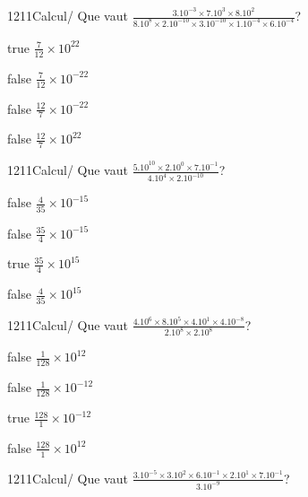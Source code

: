             \begin{question}{1211}{Calcul}{}{/}
                Que vaut $\frac{3.10^{-3}\times 7.10^{3}\times 8.10^{2}}{8.10^{8}\times 2.10^{-10}\times 3.10^{-10}\times 1.10^{-4}\times 6.10^{-4}}$?
            \end{question}
            \begin{reponses}
                \item[true] $\frac{7}{12}\times 10^{22}$
                \item[false] $\frac{7}{12}\times 10^{-22}$
                \item[false] $\frac{12}{7}\times 10^{-22}$
                \item[false] $\frac{12}{7}\times 10^{22}$
            \end{reponses}
            \begin{question}{1211}{Calcul}{}{/}
                Que vaut $\frac{5.10^{10}\times 2.10^{0}\times 7.10^{-1}}{4.10^{4}\times 2.10^{-10}}$?
            \end{question}
            \begin{reponses}
                \item[false] $\frac{4}{35}\times 10^{-15}$
                \item[false] $\frac{35}{4}\times 10^{-15}$
                \item[true] $\frac{35}{4}\times 10^{15}$
                \item[false] $\frac{4}{35}\times 10^{15}$
            \end{reponses}
            \begin{question}{1211}{Calcul}{}{/}
                Que vaut $\frac{4.10^{6}\times 8.10^{5}\times 4.10^{1}\times 4.10^{-8}}{2.10^{8}\times 2.10^{8}}$?
            \end{question}
            \begin{reponses}
                \item[false] $\frac{1}{128}\times 10^{12}$
                \item[false] $\frac{1}{128}\times 10^{-12}$
                \item[true] $\frac{128}{1}\times 10^{-12}$
                \item[false] $\frac{128}{1}\times 10^{12}$
            \end{reponses}
            \begin{question}{1211}{Calcul}{}{/}
                Que vaut $\frac{3.10^{-5}\times 3.10^{2}\times 6.10^{-1}\times 2.10^{1}\times 7.10^{-1}}{3.10^{-9}}$?
            \end{question}
